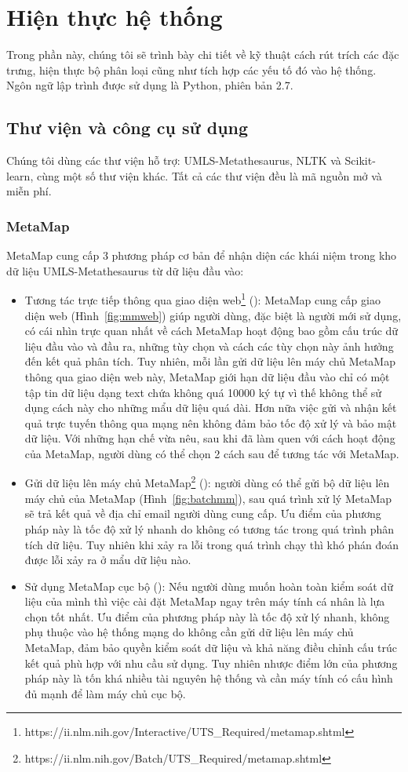 \section{Hiện thực hệ thống} \label{sec:hienthuchethong}
Trong phần này, chúng tôi sẽ trình bày chi tiết về kỹ thuật cách rút trích các đặc trưng, hiện thực bộ phân loại cũng như tích hợp các yếu tố đó vào hệ thống. Ngôn ngữ lập trình được sử dụng là Python, phiên bản 2.7.

\subsection{Thư viện và công cụ sử dụng}
Chúng tôi dùng các thư viện hỗ trợ: UMLS-Metathesaurus, NLTK và Scikit-learn, cùng một số thư viện khác. Tất cả các thư viện đều là mã nguồn mở và miễn phí.
\subsubsection*{MetaMap}
MetaMap cung cấp 3 phương pháp cơ bản để nhận diện các khái niệm trong kho dữ liệu UMLS-Metathesaurus từ dữ liệu đầu vào:
\begin{itemize}
\item Tương tác trực tiếp thông qua giao diện web\footnote{https://ii.nlm.nih.gov/Interactive/UTS\_Required/metamap.shtml} (): MetaMap cung cấp giao diện web (Hình~\ref{fig:mmweb}) giúp người dùng, đặc biệt là người mới sử dụng, có cái nhìn trực quan nhất về cách MetaMap hoạt động bao gồm cấu trúc dữ liệu đầu vào và đầu ra, những tùy chọn và cách các tùy chọn này ảnh hưởng đến kết quả phân tích. Tuy nhiên, mỗi lần gửi dữ liệu lên máy chủ MetaMap thông qua giao diện web này, MetaMap giới hạn dữ liệu đầu vào chỉ có một tập tin dữ liệu dạng text chứa không quá 10000 ký tự vì thế không thể sử dụng cách này cho những mẩu dữ liệu quá dài. Hơn nữa việc gửi và nhận kết quả trực tuyến thông qua mạng nên không đảm bảo tốc độ xử lý và bảo mật dữ liệu. Với những hạn chế vừa nêu, sau khi đã làm quen với cách hoạt động của MetaMap, người dùng có thể chọn 2 cách sau để tương tác với MetaMap.
\item Gửi dữ liệu lên máy chủ MetaMap\footnote{https://ii.nlm.nih.gov/Batch/UTS\_Required/metamap.shtml} (): người dùng có thể gửi bộ dữ liệu lên máy chủ của MetaMap (Hình~\ref{fig:batchmm}), sau quá trình xử lý MetaMap sẽ trả kết quả về địa chỉ email người dùng cung cấp. Ưu điểm của phương pháp này là tốc độ xử lý nhanh do không có tương tác trong quá trình phân tích dữ liệu. Tuy nhiên khi xảy ra lỗi trong quá trình chạy thì khó phán đoán được lỗi xảy ra ở mẩu dữ liệu nào. 
\item Sử dụng MetaMap cục bộ (): Nếu người dùng muốn hoàn toàn kiểm soát dữ liệu của mình thì việc cài đặt MetaMap ngay trên máy tính cá nhân là lựa chọn tốt nhất. Ưu điểm của phương pháp này là tốc độ xử lý nhanh, không phụ thuộc vào hệ thống mạng do không cần gửi dữ liệu lên máy chủ MetaMap, đảm bảo quyền kiểm soát dữ liệu và khả năng điều chỉnh cấu trúc kết quả phù hợp với nhu cầu sử dụng. Tuy nhiên nhược điểm lớn của phương pháp này là tốn khá nhiều tài nguyên hệ thống và cần máy tính có cấu hình đủ mạnh để làm máy chủ cục bộ.
\end{itemize}

